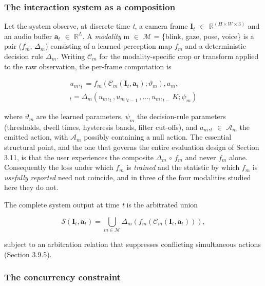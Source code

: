 \subsubsection{The interaction system as a composition}

Let the system observe, at discrete time \emph{t}, a camera frame \textbf{I}$_{t}$ $\in$ $\mathbb{R}^{(H \times W \times 3)}$ and an audio buffer \textbf{a}$_{t}$ $\in$ $\mathbb{R}^{L}$. A \emph{modality} m $\in$ $\mathcal{M}$ = \{blink, gaze, pose, voice\} is a pair ($f_{m}$, $\Delta_{m}$) consisting of a learned perception map $f_{m}$ and a deterministic decision rule $\Delta_{m}$. Writing $\mathcal{C}_{m}$ for the modality-specific crop or transform applied to the raw observation, the per-frame computation is

\begin{equation}
\label{eq:1}
\begin{aligned}
u_m, _{t} = f_m(\mathcal{C}_m(\mathbf{I}_{t}, \mathbf{a}_{t}) ; \vartheta _m), a_{m}, \\
_{t} = \Delta _m(u_m,_{t}, u_m,_{t-1}, \dots , u_m,_{t-}K ; \psi _m)
\end{aligned}
\end{equation}

where $\vartheta_{m}$ are the learned parameters, $\psi_{m}$ the decision-rule parameters (thresholds, dwell times, hysteresis bands, filter cut-offs), and $a_{m}$,$_{t}$ $\in$ $\mathcal{A}_{m}$ the emitted action, with $\mathcal{A}_{m}$ possibly containing a null action. The essential structural point, and the one that governs the entire evaluation design of Section 3.11, is that the user experiences the composite $\Delta_{m}$ $\circ$ $f_{m}$ and never $f_{m}$ alone. Consequently the loss under which $f_{m}$ is \emph{trained} and the statistic by which $f_{m}$ is \emph{usefully reported} need not coincide, and in three of the four modalities studied here they do not.

The complete system output at time \emph{t} is the arbitrated union

\begin{equation}
\label{eq:2}
\mathcal{S}(\mathbf{I}_{t}, \mathbf{a}_{t}) = \bigcup _{m \in \mathcal{M}} \Delta _m(f_m(\mathcal{C}_m(\mathbf{I}_{t}, \mathbf{a}_{t}))),
\end{equation}

subject to an arbitration relation that suppresses conflicting simultaneous actions (Section 3.9.5).

\subsubsection{The concurrency constraint}

